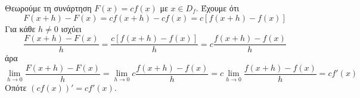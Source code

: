Θεωρούμε τη συνάρτηση $ F(x)=cf(x) $ με $ x\in D_f $. Έχουμε ότι
\[ F(x+h)-F(x)=cf(x+h)-cf(x)=c[f(x+h)-f(x)] \]
Για κάθε $ h\neq 0 $ ισχύει
\[ \frac{F(x+h)-F(x)}{h}=\frac{c[f(x+h)-f(x)]}{h}=c\frac{f(x+h)-f(x)}{h} \]
άρα 
\[ \lim_{h\to 0}{\frac{F(x+h)-F(x)}{h}}=\lim_{h\to 0}{c\frac{f(x+h)-f(x)}{h}}=c\lim_{h\to 0}{\frac{f(x+h)-f(x)}{h}}=cf'(x) \]
Οπότε $ (cf(x))'=cf'(x) $.
